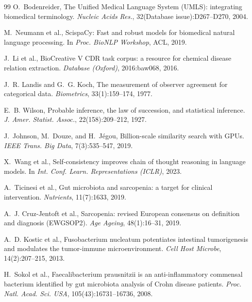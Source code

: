 \documentclass[10pt,twocolumn,letterpaper]{article}
\begin{document}
\begin{thebibliography}{99}
O.~Bodenreider,
\newblock The Unified Medical Language System (UMLS): integrating biomedical
terminology.
\newblock \emph{Nucleic Acids Res.}, 32(Database issue):D267--D270, 2004.

M.~Neumann et al.,
\newblock ScispaCy: Fast and robust models for biomedical natural language
processing.
\newblock In \emph{Proc. BioNLP Workshop}, ACL, 2019.

J.~Li et al.,
\newblock BioCreative V CDR task corpus: a resource for chemical disease
relation extraction.
\newblock \emph{Database (Oxford)}, 2016:baw068, 2016.

J.~R. Landis and G.~G. Koch,
\newblock The measurement of observer agreement for categorical data.
\newblock \emph{Biometrics}, 33(1):159--174, 1977.

E.~B. Wilson,
\newblock Probable inference, the law of succession, and statistical
inference.
\newblock \emph{J. Amer. Statist. Assoc.}, 22(158):209--212, 1927.

J.~Johnson, M.~Douze, and H.~J\'egou,
\newblock Billion-scale similarity search with GPUs.
\newblock \emph{IEEE Trans. Big Data}, 7(3):535--547, 2019.

X.~Wang et al.,
\newblock Self-consistency improves chain of thought reasoning in language
models.
\newblock In \emph{Int. Conf. Learn. Representations (ICLR)}, 2023.

A.~Ticinesi et al.,
\newblock Gut microbiota and sarcopenia: a target for clinical intervention.
\newblock \emph{Nutrients}, 11(7):1633, 2019.

A.~J. Cruz-Jentoft et al.,
\newblock Sarcopenia: revised European consensus on definition and diagnosis
(EWGSOP2).
\newblock \emph{Age Ageing}, 48(1):16--31, 2019.

A.~D. Kostic et al.,
\newblock Fusobacterium nucleatum potentiates intestinal tumorigenesis and
modulates the tumor-immune microenvironment.
\newblock \emph{Cell Host Microbe}, 14(2):207--215, 2013.

H.~Sokol et al.,
\newblock Faecalibacterium prausnitzii is an anti-inflammatory commensal
bacterium identified by gut microbiota analysis of Crohn disease patients.
\newblock \emph{Proc. Natl. Acad. Sci. USA}, 105(43):16731--16736, 2008.


\end{thebibliography}
\end{document}
